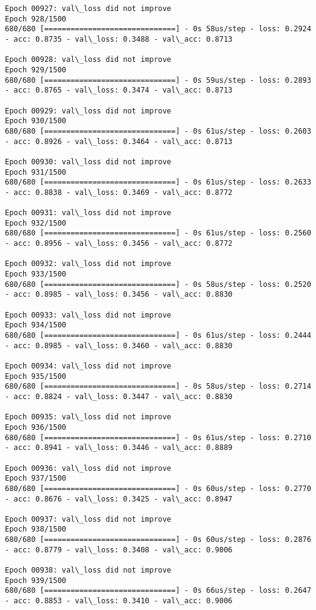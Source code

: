 \documentclass[11pt]{article}
\begin{document}
\begin{Verbatim}[commandchars=\\\{\}]
Epoch 00927: val\_loss did not improve
Epoch 928/1500
680/680 [==============================] - 0s 58us/step - loss: 0.2924 - acc: 0.8735 - val\_loss: 0.3488 - val\_acc: 0.8713

Epoch 00928: val\_loss did not improve
Epoch 929/1500
680/680 [==============================] - 0s 59us/step - loss: 0.2893 - acc: 0.8765 - val\_loss: 0.3474 - val\_acc: 0.8713

Epoch 00929: val\_loss did not improve
Epoch 930/1500
680/680 [==============================] - 0s 61us/step - loss: 0.2603 - acc: 0.8926 - val\_loss: 0.3464 - val\_acc: 0.8713

Epoch 00930: val\_loss did not improve
Epoch 931/1500
680/680 [==============================] - 0s 61us/step - loss: 0.2633 - acc: 0.8838 - val\_loss: 0.3469 - val\_acc: 0.8772

Epoch 00931: val\_loss did not improve
Epoch 932/1500
680/680 [==============================] - 0s 61us/step - loss: 0.2560 - acc: 0.8956 - val\_loss: 0.3456 - val\_acc: 0.8772

Epoch 00932: val\_loss did not improve
Epoch 933/1500
680/680 [==============================] - 0s 58us/step - loss: 0.2520 - acc: 0.8985 - val\_loss: 0.3456 - val\_acc: 0.8830

Epoch 00933: val\_loss did not improve
Epoch 934/1500
680/680 [==============================] - 0s 61us/step - loss: 0.2444 - acc: 0.8985 - val\_loss: 0.3460 - val\_acc: 0.8830

Epoch 00934: val\_loss did not improve
Epoch 935/1500
680/680 [==============================] - 0s 58us/step - loss: 0.2714 - acc: 0.8824 - val\_loss: 0.3447 - val\_acc: 0.8830

Epoch 00935: val\_loss did not improve
Epoch 936/1500
680/680 [==============================] - 0s 61us/step - loss: 0.2710 - acc: 0.8941 - val\_loss: 0.3446 - val\_acc: 0.8889

Epoch 00936: val\_loss did not improve
Epoch 937/1500
680/680 [==============================] - 0s 60us/step - loss: 0.2770 - acc: 0.8676 - val\_loss: 0.3425 - val\_acc: 0.8947

Epoch 00937: val\_loss did not improve
Epoch 938/1500
680/680 [==============================] - 0s 60us/step - loss: 0.2876 - acc: 0.8779 - val\_loss: 0.3408 - val\_acc: 0.9006

Epoch 00938: val\_loss did not improve
Epoch 939/1500
680/680 [==============================] - 0s 66us/step - loss: 0.2647 - acc: 0.8853 - val\_loss: 0.3410 - val\_acc: 0.9006


\end{Verbatim}
\end{document}
